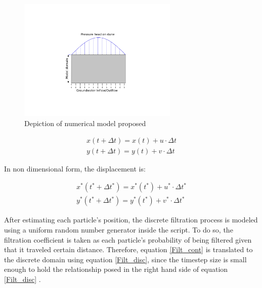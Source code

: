 \documentclass[draft,linenumbers]{agujournal2018}
\begin{document}
\begin{figure}[ht]
\centering
\includegraphics[clip, trim=4.2cm 4.5cm 8cm 3cm, width=18pc]
{181129Numerical.pdf}
\caption{Depiction of numerical model proposed}
\label{Numerical}
\end{figure}

\begin{eqnarray}
 \label{dispx}
 	x(t + \Delta t) = x(t)  + u \cdot \Delta t\\
 \label{dispy}
 	y(t + \Delta t) = y(t) + v \cdot \Delta t
 \end{eqnarray}
 
In non dimensional form, the displacement is:

\begin{eqnarray}
 \label{dispx_s}
 	x^*(t^* + \Delta t^*) = x^*(t^*)  + u^* \cdot \Delta t^*\\
 \label{dispy_s}
 	y^*(t^* + \Delta t^*) = y^*(t^*) + v^* \cdot \Delta t^*
 \end{eqnarray}
 
After estimating each particle's position, the discrete filtration process is modeled using a uniform random number generator inside the script. To do so, the filtration coefficient is taken as each  particle's probability of being filtered given that it traveled certain  distance. Therefore, equation \ref{Filt_cont} is translated to the discrete domain using equation \ref{Filt_disc}, since the timestep size is small enough to hold the relationship posed in the right hand side of equation \ref{Filt_disc} \citep{Li2017}.
 
\end{document}
